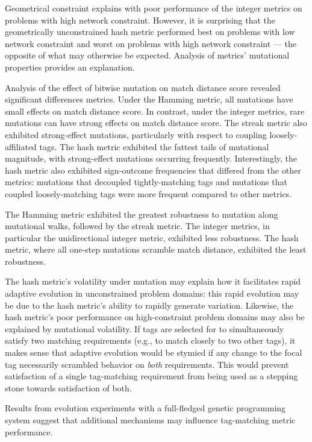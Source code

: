 Geometrical constraint explains with poor performance of the integer metrics on problems with high network constraint.
However, it is surprising that the geometrically unconstrained hash metric performed best on problems with low network constraint and worst on problems with high network constraint  --- the opposite of what may otherwise be expected.
Analysis of metrics' mutational properties provides an explanation.

Analysis of the effect of bitwise mutation on match distance score revealed significant differences metrics.
Under the Hamming metric, all mutations have small effects on match distance score.
In contrast, under the integer metrics, rare mutations can have strong effects on match distance score.
The streak metric also exhibited strong-effect mutations, particularly with respect to coupling loosely-affiliated tags.
The hash metric exhibited the fattest tails of mutational magnitude, with strong-effect mutations occurring frequently.
Interestingly, the hash metric also exhibited sign-outcome frequencies that differed from the other metrics: mutations that decoupled tightly-matching tags and mutations that coupled loosely-matching tags were more frequent compared to other metrics.

The Hamming metric exhibited the greatest robustness to mutation along mutational walks, followed by the streak metric.
The integer metrics, in particular the unidirectional integer metric, exhibited less robustness.
The hash metric, where all one-step mutations scramble match distance, exhibited the least robustness.

The hash metric's volatility under mutation may explain how it facilitates rapid adaptive evolution in unconstrained problem domains: this rapid evolution may be due to the hash metric's ability to rapidly generate variation.
Likewise, the hash metric's poor performance on high-constraint problem domains may also be explained by mutational volatility.
If tags are selected for to simultaneously satisfy two matching requirements (e.g., to match closely to two other tags), it makes sense that adaptive evolution would be stymied if any change to the focal tag necessarily scrambled behavior on \textit{both} requirements.
This would prevent satisfaction of a single tag-matching requirement from being used as a stepping stone towards satisfaction of both.

Results from evolution experiments with a full-fledged genetic programming system suggest that additional mechanisms may influence tag-matching metric performance.

